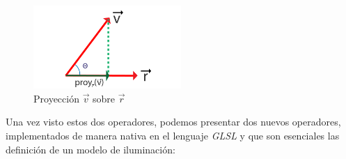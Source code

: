 \begin{figure}[H]
  \centering
  \captionsetup{justification=centering}%
  \includegraphics[width=0.5\textwidth]{secciones/imagenes/sdf/proofs/proyection.png}
  \caption{Proyección \(\Vec{v}\) sobre \(\Vec{r}\)}
  \label{fig:proyection}
\end{figure}
Una vez visto estos dos operadores, podemos presentar dos nuevos operadores, implementados de manera nativa en el lenguaje \textit{GLSL} y que son esenciales las definición de un modelo de iluminación:
